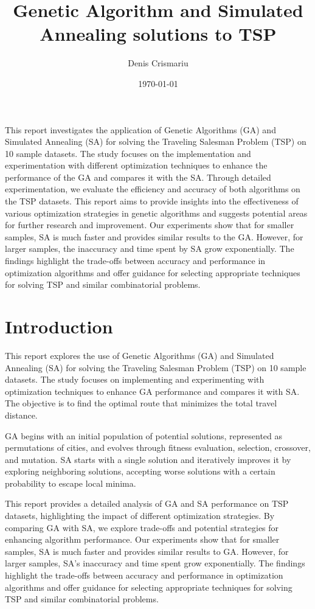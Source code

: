 \documentclass{article}
\title{Genetic Algorithm and Simulated Annealing solutions to TSP}
\author{Denis Crismariu}
\date{\today}
\begin{document}
\maketitle

\abstract

This report investigates the application of Genetic Algorithms (GA) and Simulated Annealing (SA) for solving the Traveling Salesman Problem (TSP) on 10 sample datasets. The study focuses on the implementation and experimentation with different optimization techniques to enhance the performance of the GA and compares it with the SA. Through detailed experimentation, we evaluate the efficiency and accuracy of both algorithms on the TSP datasets. This report aims to provide insights into the effectiveness of various optimization strategies in genetic algorithms and suggests potential areas for further research and improvement. Our experiments show that for smaller samples, SA is much faster and provides similar results to the GA. However, for larger samples, the inaccuracy and time spent by SA grow exponentially. The findings highlight the trade-offs between accuracy and performance in optimization algorithms and offer guidance for selecting appropriate techniques for solving TSP and similar combinatorial problems.

\section{Introduction}
This report explores the use of Genetic Algorithms (GA) and Simulated Annealing (SA) for solving the Traveling Salesman Problem (TSP) on 10 sample datasets. The study focuses on implementing and experimenting with optimization techniques to enhance GA performance and compares it with SA. The objective is to find the optimal route that minimizes the total travel distance.

GA begins with an initial population of potential solutions, represented as permutations of cities, and evolves through fitness evaluation, selection, crossover, and mutation. SA starts with a single solution and iteratively improves it by exploring neighboring solutions, accepting worse solutions with a certain probability to escape local minima.

This report provides a detailed analysis of GA and SA performance on TSP datasets, highlighting the impact of different optimization strategies. By comparing GA with SA, we explore trade-offs and potential strategies for enhancing algorithm performance. Our experiments show that for smaller samples, SA is much faster and provides similar results to GA. However, for larger samples, SA's inaccuracy and time spent grow exponentially. The findings highlight the trade-offs between accuracy and performance in optimization algorithms and offer guidance for selecting appropriate techniques for solving TSP and similar combinatorial problems.
\end{document}
